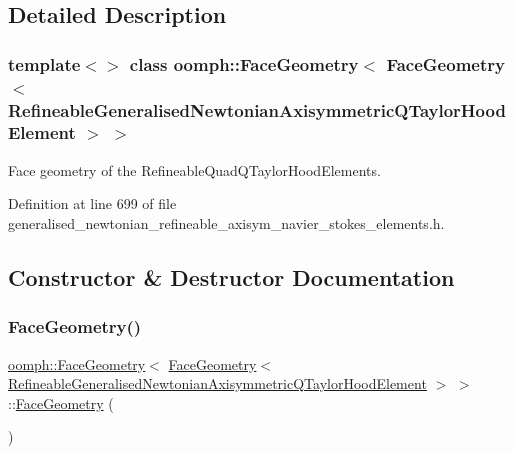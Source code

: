 \subsection{Detailed Description}
\subsubsection*{template$<$$>$\newline
class oomph\+::\+Face\+Geometry$<$ Face\+Geometry$<$ Refineable\+Generalised\+Newtonian\+Axisymmetric\+Q\+Taylor\+Hood\+Element $>$ $>$}

Face geometry of the Refineable\+Quad\+Q\+Taylor\+Hood\+Elements. 

Definition at line 699 of file generalised\+\_\+newtonian\+\_\+refineable\+\_\+axisym\+\_\+navier\+\_\+stokes\+\_\+elements.\+h.



\subsection{Constructor \& Destructor Documentation}
\mbox{\label{classoomph_1_1FaceGeometry_3_01FaceGeometry_3_01RefineableGeneralisedNewtonianAxisymmetricQTaylorHoodElement_01_4_01_4_a9d8669ff8e6828f935e46ca93166cdbb}} 
\subsubsection{\texorpdfstring{Face\+Geometry()}{FaceGeometry()}}
{\footnotesize\ttfamily \hyperlink{classoomph_1_1FaceGeometry}{oomph\+::\+Face\+Geometry}$<$ \hyperlink{classoomph_1_1FaceGeometry}{Face\+Geometry}$<$ \hyperlink{classoomph_1_1RefineableGeneralisedNewtonianAxisymmetricQTaylorHoodElement}{Refineable\+Generalised\+Newtonian\+Axisymmetric\+Q\+Taylor\+Hood\+Element} $>$ $>$\+::\hyperlink{classoomph_1_1FaceGeometry}{Face\+Geometry} (\begin{DoxyParamCaption}{ }\end{DoxyParamCaption})\hspace{0.3cm}{\ttfamily [inline]}}



